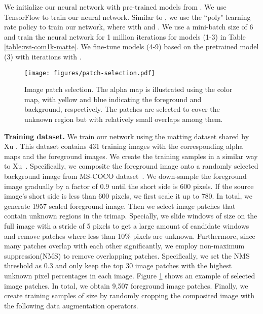 \documentclass[10pt,twocolumn,letterpaper]{article}
\begin{document}
We initialize our neural network with pre-trained models from \cite{deeplabv3plus2018}. We use TensorFlow to train our neural network. Similar to \cite{deeplabv3plus2018}, we use the ``poly" learning rate policy to train our network, where  with  and . We use a mini-batch size of 6 and train the neural network for 1 million iterations for models (1-3) in Table \ref{table:rst-com1k-matte}. We fine-tune models (4-9) based on the pretrained model (3) with  iterations with . 

\begin{figure}[t]
	\centering
	\texttt{[image: figures/patch-selection.pdf]}
	\caption{Image patch selection. The alpha map is illustrated using the color map, with yellow and blue indicating the foreground and background, respectively. The patches are selected to cover the unknown region but with relatively small overlaps among them.}\vspace{-0.15in}
	\label{fig:patch-selection}
\end{figure}



\noindent\textbf{Training dataset.} We train our network using the matting dataset shared by Xu \etal\cite{xu2017deep}. This dataset contains 431 training images with the corresponding alpha maps and the foreground images. We create the training samples in a similar way to Xu~\etal. Specifically, we composite the foreground image onto a randomly selected background image from MS-COCO dataset~\cite{lin2014microsoft}. We down-sample the foreground image gradually by a factor of 0.9 until the short side is 600 pixels. If the source image's short side is less than 600 pixels, we first scale it up to 780. In total, we generate 1957 scaled foreground image. Then we select image patches that contain unknown regions in the trimap. Specially, we slide windows of size  on the full image with a stride of 5 pixels to get a large amount of candidate windows and remove patches where less than 10\% pixels are unknown. Furthermore, since many patches overlap with each other significantly, we employ non-maximum suppression(NMS) to remove overlapping patches. Specifically, we set the NMS threshold as 0.3 and only keep the top 30 image patches with the highest unknown pixel percentages in each image. Figure \ref{fig:patch-selection} shows an example of selected image patches. In total, we obtain 9,507  foreground image patches. Finally, we create training samples of size  by randomly cropping the composited image with the following data augmentation operators. 
\end{document}
